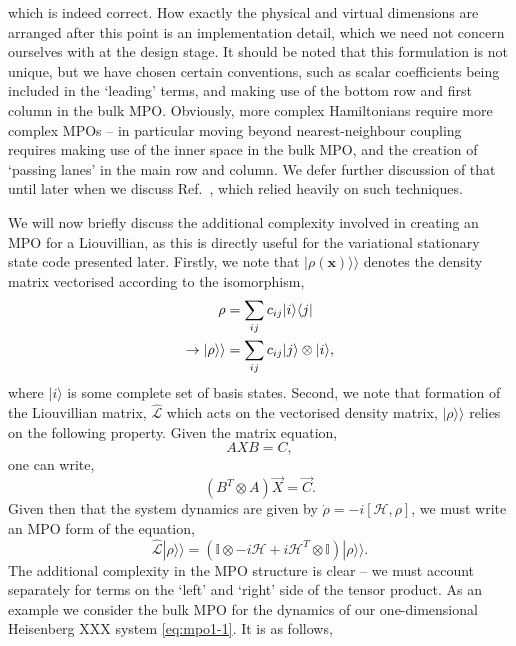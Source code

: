  which is indeed correct. How exactly the physical and virtual dimensions are arranged after this point is an implementation detail, which we need not concern ourselves with at the design stage. It should be noted that this formulation is not unique, but we have chosen certain conventions, such as scalar coefficients being included in the `leading' terms, and making use of the bottom row and first column in the bulk MPO. Obviously, more complex Hamiltonians require more complex MPOs -- in particular moving beyond nearest-neighbour coupling requires making use of the inner space in the bulk MPO, and the creation of `passing lanes' in the main row and column. We defer further discussion of that until later when we discuss Ref.~\cite{Owen2017}, which relied heavily on such techniques.

 We will now briefly discuss the additional complexity involved in creating an MPO for a Liouvillian, as this is directly useful for the variational stationary state code presented later. Firstly, we note that \(|\rho (\mathbf{x}) \rangle \rangle\) denotes the density matrix vectorised according to the isomorphism,
\begin{align}
\rho &= \sum_{ij} c_{ij} |i \rangle \langle j| \notag \\
\rightarrow | \rho \rangle \rangle &= \sum_{ij} c_{ij} |j \rangle \otimes |i \rangle,
\label{eq:vs1-11}
\end{align}
where \(|i\rangle\) is some complete set of basis states. Second, we note that formation of the Liouvillian matrix, \(\hat{\mathcal{L}}\) which acts on the vectorised density matrix, \(|\rho \rangle \rangle\) relies on the following property. Given the matrix equation,
 \begin{equation}
 	AXB = C,
 	\label{eq:mpo1-6}
 \end{equation}
 one can write,
 \begin{equation}
 	(B^{T} \otimes A)\vec{X} = \vec{C}.
 	\label{eq:mpo1-7}
 \end{equation}
 Given then that the system dynamics are given by \(\dot{\rho} = -i[\mathcal{H}, \rho]\), we must write an MPO form of the equation,
 \begin{equation}
 	\hat{\mathcal{L}}|\rho \rangle \rangle = \left( \mathbb{I} \otimes -i\mathcal{H} + i\mathcal{H}^{T} \otimes \mathbb{I} \right)| \rho \rangle \rangle.
 	\label{eq:mpo1-8}
 \end{equation}
 The additional complexity in the MPO structure is clear -- we must account separately for terms on the `left' and `right' side of the tensor product. As an example we consider the bulk MPO for the dynamics of our one-dimensional Heisenberg XXX system \cref{eq:mpo1-1}. It is as follows,

